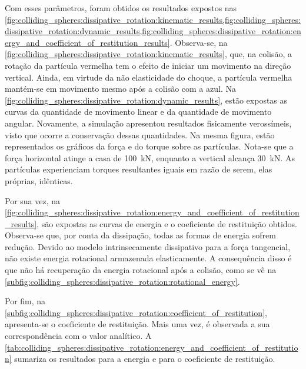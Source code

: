 Com esses parâmetros, foram obtidos os resultados expostos nas \cref{fig:colliding_spheres:dissipative_rotation:kinematic_results,fig:colliding_spheres:dissipative_rotation:dynamic_results,fig:colliding_spheres:dissipative_rotation:energy_and_coefficient_of_restitution_results}. Observa-se, na \cref{fig:colliding_spheres:dissipative_rotation:kinematic_results}, que, na colisão, a rotação da partícula vermelha tem o efeito de iniciar um movimento na direção vertical. Ainda, em virtude da não elasticidade do choque, a partícula vermelha mantém-se em movimento mesmo após a colisão com a azul. Na \cref{fig:colliding_spheres:dissipative_rotation:dynamic_results}, estão expostas as curvas da quantidade de movimento linear e da quantidade de movimento angular. Novamente, a simulação apresentou resultados fisicamente verossímeis, visto que ocorre a conservação dessas quantidades. Na mesma figura, estão representados os gráficos da força e do torque sobre as partículas. Nota-se que a força horizontal atinge a casa de \SI{100}{\kilo\newton}, enquanto a vertical alcança \SI{30}{\kilo\newton}. As partículas experienciam torques resultantes iguais em razão de serem, elas próprias, idênticas. 

Por sua vez, na \cref{fig:colliding_spheres:dissipative_rotation:energy_and_coefficient_of_restitution_results}, são expostas as curvas de energia e o coeficiente de restituição obtidos. Observa-se que, por conta da dissipação, todas as formas de energia sofrem redução. Devido ao modelo intrinsecamente dissipativo para a força tangencial, não existe energia rotacional armazenada elasticamente. A consequência disso é que não há recuperação da energia rotacional após a colisão, como se vê na \cref{subfig:colliding_spheres:dissipative_rotation:rotational_energy}. 

Por fim, na \cref{subfig:colliding_spheres:dissipative_rotation:coefficient_of_restitution}, apresenta-se o coeficiente de restituição. Mais uma vez, é observada a sua correspondência com o valor analítico. A \cref{tab:colliding_spheres:dissipative_rotation:energy_and_coefficient_of_restitution} sumariza os resultados para a energia e para o coeficiente de restituição.

